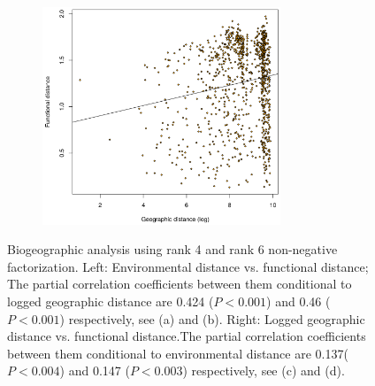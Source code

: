 \begin{figure}[!ht]
\begin{subfigure}[t]{2.8in}
    \includegraphics[width=2.8in]{NMF/figures/figS8d}
 \end{subfigure}
 \caption{Biogeographic analysis using rank 4 and rank 6 non-negative factorization. Left: Environmental distance vs. functional distance; The partial correlation coefficients between them conditional to logged geographic distance are 0.424 ($P<0.001$) and 0.46 ($P<0.001$) respectively, see (a) and (b). Right: Logged geographic distance vs. functional distance.The partial correlation coefficients between them conditional to environmental distance are 0.137($P<0.004$) and 0.147 ($P<0.003$) respectively, see (c) and (d). }
 \label{scatterplot}
\end{figure}




